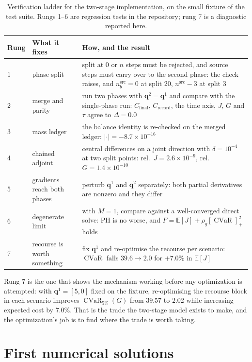 \documentclass[11pt]{article}
\newcommand{\E}{\mathbb{E}}
\newcommand{\qq}{\mathbf{q}}
\newcommand{\CVaR}{\operatorname{CVaR}}
\begin{document}
\begin{table}[t]
\centering
\small
\begin{tabularx}{\textwidth}{@{}l l X@{}}
\toprule
Rung & What it fixes & How, and the result \\
\midrule
1 & phase split & split at $0$ or $n$ steps must be rejected, and source steps
  must carry over to the second phase: the check raises, and
  $n^{\text{src}}_b=0$ at split $20$, $n^{\text{src}}-3$ at split $3$ \\
2 & merge and parity & run two phases with $\qq^{2}=\qq^{1}$ and compare with the
  single-phase run: $C_{\text{final}}$, $C_{\text{record}}$, the time axis, $J$,
  $G$ and $\tau$ agree to $\Delta=0.0$ \\
3 & mass ledger & the balance identity is re-checked on the merged ledger:
  $\lvert\cdot\rvert=-8.7\times10^{-16}$ \\
4 & chained adjoint & central differences on a joint direction with
  $\delta=10^{-4}$ at two split points: rel.\ $J=2.6\times10^{-9}$, rel.\
  $G=1.4\times10^{-10}$ \\
5 & gradients reach both phases & perturb $\qq^{1}$ and $\qq^{2}$ separately:
  both partial derivatives are nonzero and they differ \\
6 & degenerate limit & with $M=1$, compare against a well-converged direct solve:
  PH is no worse, and $F=\E[J]+\rho_g[\CVaR]_+^{2}$ holds \\
7 & recourse is worth something & fix $\qq^{1}$ and re-optimise the recourse per
  scenario: $\CVaR$ falls $39.6\to2.0$ for $+7.0\%$ in $\E[J]$ \\
\bottomrule
\end{tabularx}
\caption{Verification ladder for the two-stage implementation, on the small
fixture of the test suite. Rungs 1--6 are regression tests in the repository;
rung 7 is a diagnostic reported here.}
\label{tab:appx-ver}
\end{table}

Rung 7 is the one that shows the mechanism working before any optimization is
attempted: with $\qq^{1}=[5,0]$ fixed on the fixture, re-optimising the recourse
block in each scenario improves $\CVaR_{5\%}(G)$ from $39.57$ to $2.02$ while
increasing expected cost by $7.0\%$. That is the trade the two-stage model exists
to make, and the optimization's job is to find where the trade is worth taking.

\section{First numerical solutions}
\label{sec:appx-numbers}
\end{document}
